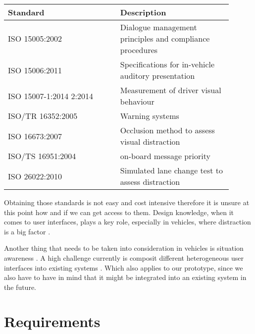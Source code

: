\documentclass[hidelinks]{sig-alternate}
\begin{document}
\vspace{3mm}
\noindent
\def\arraystretch{1.2}
\begin{tabular}{p{0.45\linewidth} | p{0.45\linewidth}}
Standard & Description \\\hline
ISO 15005:2002 & Dialogue management principles and compliance procedures \cite{3}\href{http://www.iso.org/iso/home/store/catalogue_tc/catalogue_detail.htm?csnumber=34085}{}\\\hline
ISO 15006:2011 & Specifications for in-vehicle auditory presentation \cite{3}\href{http://www.iso.org/iso/home/store/catalogue_tc/catalogue_detail.htm?csnumber=55322}{}\\\hline
ISO 15007-1:2014 2:2014 & Measurement of driver visual behaviour \cite{3}\href{http://www.iso.org/iso/home/store/catalogue_tc/catalogue_detail.htm?csnumber=63220}{}\\\hline
ISO/TR 16352:2005 & Warning systems \cite{3}\href{http://www.iso.org/iso/home/store/catalogue_tc/catalogue_detail.htm?csnumber=37859}{}\\\hline
ISO 16673:2007 & Occlusion method to assess visual distraction \cite{3}\href{http://www.iso.org/iso/home/store/catalogue_tc/catalogue_detail.htm?csnumber=38035\#5}{}\\\hline
ISO/TS 16951:2004 & on-board message priority \cite{3}\href{http://www.iso.org/iso/home/store/catalogue_tc/catalogue_detail.htm?csnumber=29024}{} \\\hline
ISO 26022:2010 & Simulated lane change test to assess distraction \cite{3}\href{http://www.iso.org/iso/home/store/catalogue_tc/catalogue_detail.htm?csnumber=43361}{}
\end{tabular}
\vspace{3mm}

Obtaining those standards is not easy and cost intensive therefore it is unsure at this point how and if we can get
access to them. Design knowledge, when it comes to  user interfaces, plays a key role, especially in vehicles, where
distraction is a big factor  \cite{Developmentofanautomotiveuserinterfacedesignknowledgesystem}.

Another thing that needs to be taken into consideration in vehicles is situation awareness \cite{Skrypchuk2016}. A
high challenge currently is composit different heterogeneous user interfaces into existing systems
\cite{Holstein2015}. Which also applies to our prototype, since we also have to have in mind that it might be
integrated into an existing system in the future.


\section{Requirements}
\end{document}
